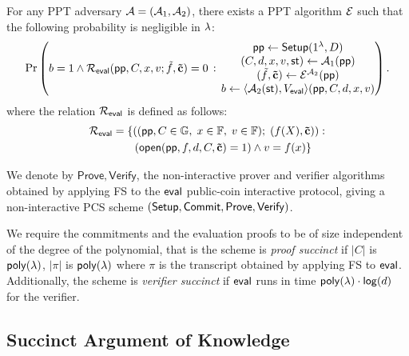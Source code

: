 \begin{definition}[Extractability]
\label{def:pcs-ext-app}
For any PPT adversary $\mathcal{A} = (\mathcal{A}_{1},\mathcal{A}_{2})$, there exists a PPT algorithm $\mathcal{E}$ such that the following probability is negligible in $\lambda$:
	 \[
    \Pr\left(
      \begin{matrix}
      b = 1 \wedge
      \mathcal{R}_{\mathsf{eval}}(\mathsf{pp},C,x,v; \tilde{f},\mathbf{\tilde{c}}) = 0
      \end{matrix}
      \,:\,
      \begin{matrix}
         \mathsf{pp} \leftarrow \mathsf{Setup}(1^{\lambda},D) \\
          (C,d,x,v,\mathsf{st}) \leftarrow \mathcal{A}_{1}(\mathsf{pp}) \\
         (\tilde{f},\mathbf{\tilde{c}}) \leftarrow \mathcal{E}^{\mathcal{A}_{2}}(\mathsf{pp})\\
         b \leftarrow \langle \mathcal{A}_{2}(\mathsf{st}), V_{\mathsf{eval}} \rangle(\mathsf{pp},C,d,x,v)
      \end{matrix}
    \right).
  \]
  where the relation $\mathcal{R}_{\mathsf{eval}}$ is defined as follows:
\begin{align*}
        \mathcal{R}_{\mathsf{eval}} &= \{\left((\mathsf{pp},C \in \mathbb{G},\; x \in \mathbb{F}, \; v \in \mathbb{F});\; (f(X), \mathbf{\tilde{c}}) \right) : \\
        &\qquad (
        \mathsf{open}(\mathsf{pp},f,d,C,\mathbf{\tilde{c}}) = 1 )
         \land v = f(x)  \}
    \end{align*} 
    
\end{definition}

We denote by $\mathsf{Prove}, \mathsf{Verify}$, the non-interactive prover and verifier algorithms obtained by applying FS to the 
$\mathsf{eval}$ public-coin interactive protocol, giving a non-interactive PCS scheme $(\mathsf{Setup},\mathsf{Commit},\allowbreak \mathsf{Prove},\mathsf{Verify})$.

\begin{definition}[Succinctness]
\label{def:pcs-succinct}
We require the commitments and the evaluation proofs to be of size independent of the degree of the polynomial, that is the scheme is \emph{proof succinct} if
$|C|$ is $\mathsf{poly}(\lambda)$, $|\pi|$ is $\mathsf{poly}(\lambda)$ where $\pi$ is the transcript obtained by applying FS to $\mathsf{eval}$. Additionally, the scheme is \emph{verifier succinct} if $\mathsf{eval}$ runs in time
$\mathsf{poly}(\lambda) \cdot \allowbreak \mathsf{log} (d)$ for the verifier.
\end{definition}


\subsection{Succinct Argument of Knowledge}
\label{sec:aok}